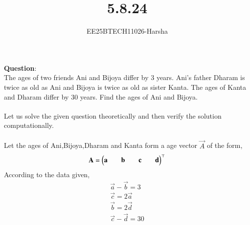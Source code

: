 \documentclass[journal]{IEEEtran}
\begin{document}

\vspace{3cm}

\title{5.8.24}
\author{EE25BTECH11026-Harsha}
 \maketitle
{\let\newpage\relax\maketitle}

\renewcommand{\thefigure}{\theenumi}
\renewcommand{\thetable}{\theenumi}
\setlength{\intextsep}{10pt} %


\renewcommand{\thetable}{\theenumi}

\textbf{Question}:\\
The ages of two friends Ani and Bijoya differ by 3 years. Ani's father Dharam is
twice as old as Ani and Bijoya is twice as old as sister Kanta. The ages of Kanta and Dharam differ by 30 years. Find the ages of Ani and Bijoya.\\
\solution \\
Let us solve the given question theoretically and then verify the solution computationally.\\
\\
Let the ages of Ani,Bijoya,Dharam and Kanta form a age vector $\vec{A}$ of the form,
\begin{align}
    \mathbf{A}=\begin{pmatrix}\mathbf{a}&&\mathbf{b}&&\mathbf{c}&&\mathbf{d}\end{pmatrix}^{\top}
\end{align}
According to the data given,
\begin{align}
    \vec{a}-\vec{b}=3\\
    \vec{c}=2\vec{a}\\
    \vec{b}=2\vec{d}\\
    \vec{c}-\vec{d}=30
\end{align}
\end{document}
